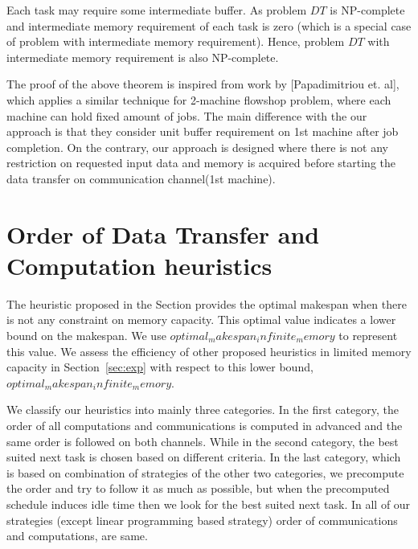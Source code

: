 \documentclass[runningheads]{llncs} %
\begin{document}
Each task may require some intermediate buffer. As problem $DT$ is NP-complete and intermediate 
memory requirement of each task is zero (which is a special case of problem with intermediate memory 
requirement). Hence, problem $DT$ with intermediate memory requirement is also NP-complete.





The proof of the above theorem is inspired from work by [Papadimitriou et. al], which applies a similar 
technique for 2-machine flowshop problem, where each machine can hold fixed amount of jobs. The 
main difference with the our approach is that they consider unit buffer requirement on 1st machine 
after job completion. On the contrary, our approach is designed where there is not any restriction on 
requested input data and memory is acquired before starting the data transfer on communication 
channel(1st machine).


	
	\section{Order of Data Transfer and Computation heuristics}

The heuristic proposed in the Section provides the optimal makespan when there is not any constraint on memory capacity. This optimal value indicates a lower bound on the makespan. We use $optimal_makespan_infinite_memory$ to represent this value. We assess the efficiency of other proposed heuristics in limited memory capacity in Section~\ref{sec:exp} with respect to this lower bound, $optimal_makespan_infinite_memory$.


We classify our heuristics into mainly three categories. In the first category, the order of all computations and communications is computed in advanced and the same order is followed on both channels. While in the second category, the best suited next task is chosen based on different criteria. In the last category, which is based on combination of strategies of the other two categories, we precompute the order and try to follow it as much as possible, but when the precomputed schedule induces idle time then we look for the best suited next task. In all of our strategies (except linear programming based strategy) order of communications and computations, are same.
\end{document}
